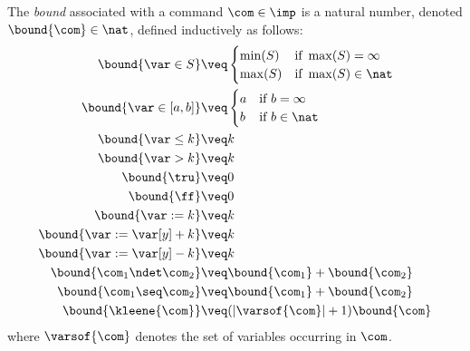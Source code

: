 \begin{definition}
  \label{de:bound}
  The \emph{bound} associated with a command \(\com\in \imp\) is a
  natural number, denoted \(\bound{\com}\in \nat\), defined
  inductively as follows:
  \begin{align*}
    \bound{\var \in S}  
    & \veq \begin{cases}
      \min(S) & \text{if } \max(S)=\infty\\
      \max(S) & \text{if } \max(S)\in \nat
    \end{cases}
    \\
    \bound{\var \in [a,b]}  
    & \veq \begin{cases}
      a & \text{if } b=\infty\\
      b & \text{if } b\in \nat
    \end{cases}
    \\
    \bound{\var \leq k}  
    & \veq k\\
    \bound{\var > k} 
    & \veq k\\
    \bound{\tru} 
    & \veq 0\\
    \bound{\ff} 
    & \veq 0\\
    \bound{\var := k} 
    & \veq k\\
    \bound{\var := \var[y] + k}
    & \veq k\\
    \bound{\var := \var[y] - k}
    & \veq k\\
    \bound{\com_1 \ndet \com_2}
    & \veq \bound{\com_1} + \bound{\com_2}\\
    \bound{\com_1 \seq \com_2}
    & \veq \bound{\com_1} + \bound{\com_2}\\
    \bound{\kleene{\com}}
    & \veq (|\varsof{\com}|+1) \bound{\com} \\ 
  \end{align*}
  where \(\varsof{\com}\) denotes the set of variables occurring in 
  \(\com\).
\end{definition}

